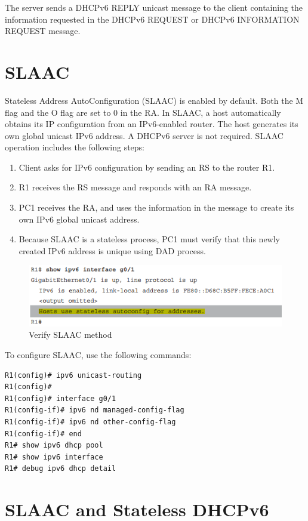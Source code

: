 The server sends a DHCPv6 REPLY unicast message to the client containing the information requested in the DHCPv6 REQUEST or DHCPv6 INFORMATION REQUEST message.

\section{SLAAC}

Stateless Address AutoConfiguration (SLAAC) is enabled by default. Both the M flag and the O flag are set to 0 in the RA. In SLAAC, a host automatically obtains its IP configuration from an IPv6-enabled router. The host generates its own global unicast IPv6 address. A DHCPv6 server is not required. SLAAC operation includes the following steps:

\begin{enumerate}
\item Client asks for IPv6 configuration by sending an RS to the router R1.
\item R1 receives the RS message and responds with an RA message.
\item PC1 receives the RA, and uses the information in the message to create its own IPv6 global unicast address. 
\item Because SLAAC is a stateless process, PC1 must verify that this newly created IPv6 address is unique using DAD process.
\end{enumerate}

\begin{figure}[hbtp]
\caption{Verify SLAAC method}
\centering
\includegraphics[scale=0.8]{pictures/SLAAC.PNG}
\end{figure}


To configure SLAAC, use the following commands:

\begin{verbatim}
R1(config)# ipv6 unicast-routing
R1(config)#
R1(config)# interface g0/1
R1(config-if)# ipv6 nd managed-config-flag
R1(config-if)# ipv6 nd other-config-flag
R1(config-if)# end
R1# show ipv6 dhcp pool 
R1# show ipv6 interface
R1# debug ipv6 dhcp detail
\end{verbatim}

\section{SLAAC and Stateless DHCPv6}

